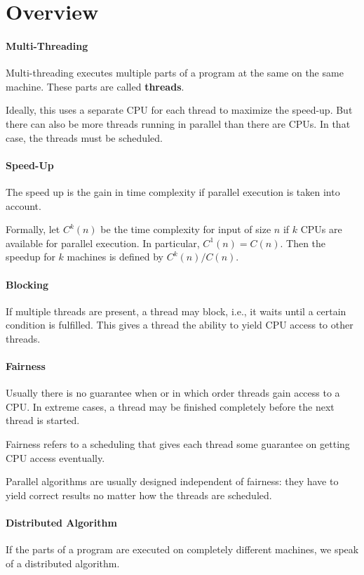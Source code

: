\section{Overview}

\paragraph{Multi-Threading}
Multi-threading executes multiple parts of a program at the same on the same machine.
These parts are called \textbf{threads}.

Ideally, this uses a separate CPU for each thread to maximize the speed-up.
But there can also be more threads running in parallel than there are CPUs.
In that case, the threads must be scheduled.

\paragraph{Speed-Up}
The speed up is the gain in time complexity if parallel execution is taken into account.

Formally, let $C^k(n)$ be the time complexity for input of size $n$ if $k$ CPUs are available for parallel execution.
In particular, $C^1(n)=C(n)$.
Then the speedup for $k$ machines is defined by $C^k(n)/C(n)$.

\paragraph{Blocking}
If multiple threads are present, a thread may block, i.e., it waits until a certain condition is fulfilled.
This gives a thread the ability to yield CPU access to other threads.

\paragraph{Fairness}
Usually there is no guarantee when or in which order threads gain access to a CPU.
In extreme cases, a thread may be finished completely before the next thread is started.

Fairness refers to a scheduling that gives each thread some guarantee on getting CPU access eventually.

Parallel algorithms are usually designed independent of fairness: they have to yield correct results no matter how the threads are scheduled.

\paragraph{Distributed Algorithm}
If the parts of a program are executed on completely different machines, we speak of a distributed algorithm.

